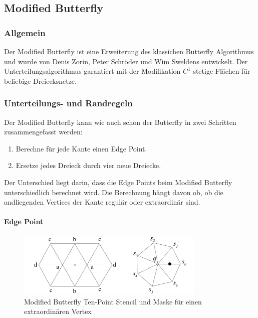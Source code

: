 \subsection{Modified Butterfly} \label{subsec:modbutterfly}

\subsubsection*{Allgemein}

Der Modified Butterfly ist eine Erweiterung des klassichen
Butterfly Algorithmus und wurde von Denis Zorin, Peter Schröder und Wim Sweldens entwickelt.
Der Unterteilungsalgorithmus garantiert mit der Modifikation \(C^1\) stetige Flächen
für beliebige Dreiecksnetze.
\cite[S. 72 ff.]{Zorin.subdivcourse}
\cite{Gamasutra}
\cite{Sharp}

\subsubsection*{Unterteilungs- und Randregeln}

Der Modified Butterfly kann wie auch schon der Butterfly in zwei Schritten zusammengefasst werden:
\begin{enumerate}
\item Berechne für jede Kante einen Edge Point.
\item Ersetze jedes Dreieck durch vier neue Dreiecke.
\end{enumerate}
Der Unterschied liegt darin, dass die Edge Points beim Modified Butterfly
unterschiedlich berechnet wird. Die Berechnung hängt davon ob,
ob die andliegenden Vertices der Kante regulär oder extraordinär sind.

\paragraph*{Edge Point}

\begin{figure}
\centering
\includegraphics[width=0.8\textwidth]{content/media/sd_modbutterfly_mask.jpg}
\caption{Modified Butterfly Ten-Point Stencil und Maske für einen extraordinären Vertex
\cite{Zorin:1996:ISM:237170.237254}}
\label{fig:sd_modbutterfly_mask}
\end{figure}

